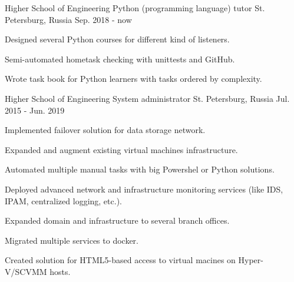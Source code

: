 

\begin{cventries}

  \cventry
    {Higher School of Engineering} %
    {Python (programming language) tutor} %
    {St. Petersburg, Russia} %
    {Sep. 2018 - now} %
    {
		\begin{cvitems} %
		 \item {Designed several Python courses for different kind of listeners.}
		 \item {Semi-automated hometask checking with unittests and GitHub.}
		 \item {Wrote task book for Python learners with tasks ordered by complexity.}
		\end{cvitems}
    }

  \cventry
	{Higher School of Engineering} %
	{System administrator} %
	{St. Petersburg, Russia} %
	{Jul. 2015 - Jun. 2019} %
	{
		\begin{cvitems} %
			\item {Implemented failover solution for data storage network.}
			\item {Expanded and augment existing virtual machines infrastructure.}
			\item {Automated multiple manual tasks with big Powershel or Python solutions.}
			\item {Deployed advanced network and infrastructure monitoring services (like IDS, IPAM, centralized logging, etc.).}
			\item {Expanded domain and infrastructure to several branch offices.}
			\item {Migrated multiple services to docker.}
			\item {Created solution for HTML5-based access to virtual macines on Hyper-V/SCVMM hosts.}
		\end{cvitems}
}

\end{cventries}
